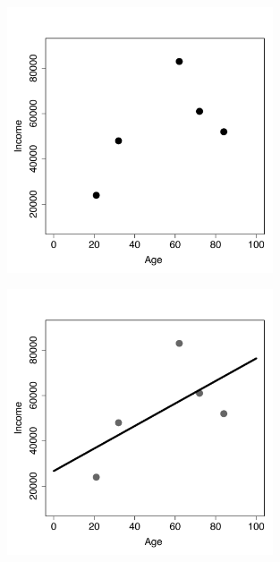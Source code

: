 \documentclass[xcolor={table}]{beamer}
\begin{document}
 \begin{frame} 
\begin{figure}[!htb]
       \begin{centering}
	\includegraphics[width=0.7\textwidth]{images/IntroOverfittingUnderfittingPlot1.pdf}
       \label{fig:ageIncome}
       \end{centering}
\end{figure}
\end{frame}



 \begin{frame} 
\begin{figure}[!htb]
       \begin{centering}
	\includegraphics[width=0.7\textwidth]{images/IntroOverfittingUnderfittingPlot2.pdf}
       \label{fig:ageIncome}
       \end{centering}
\end{figure}

\end{frame} 
\end{document}
